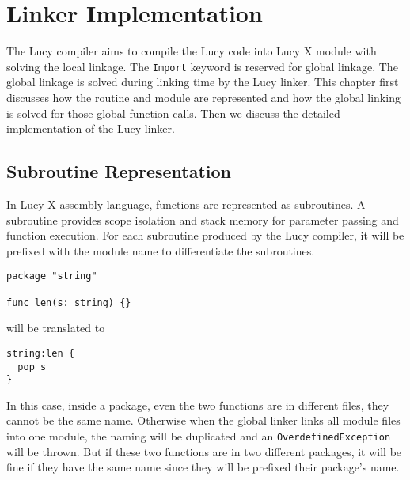 \chapter{Linker Implementation}
The Lucy compiler aims to compile the Lucy code into Lucy X module with solving the local linkage. The \texttt{Import} keyword is reserved for global linkage. The global linkage is solved during linking time by the Lucy linker. This chapter first discusses how the routine and module are represented and how the global linking is solved for those global function calls. Then we discuss the detailed implementation of the Lucy linker.


\section{Subroutine Representation}
In Lucy X assembly language, functions are represented as subroutines. A subroutine provides scope isolation and stack memory for parameter passing and function execution. For each subroutine produced by the Lucy compiler, it will be prefixed with the module name to differentiate the subroutines.
\begin{lstlisting}
package "string"

func len(s: string) {}
\end{lstlisting}
will be translated to
\begin{lstlisting}[language=LucyX]
string:len {
  pop s
}
\end{lstlisting}
In this case, inside a package, even the two functions are in different files, they cannot be the same name. Otherwise when the global linker links all module files into one module, the naming will be duplicated and an \texttt{OverdefinedException} will be thrown. But if these two functions are in two different packages, it will be fine if they have the same name since they will be prefixed their package's name.

